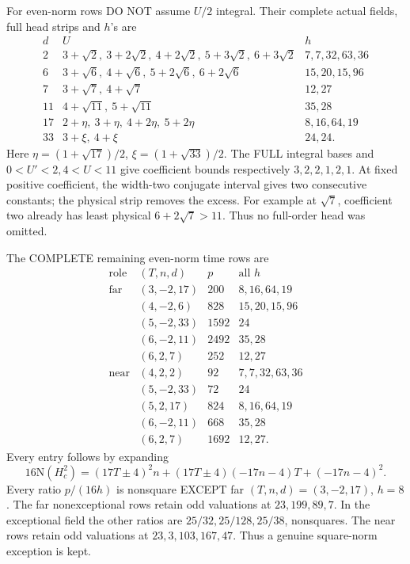 For even-norm rows DO NOT assume \(U/2\)
integral.
Their complete actual fields, full head strips
and \(h\)'s are
\[
\begin{array}{c|l|l}
 d&U&h\\ \hline
2&3+\sqrt2,\ 3+2\sqrt2,\ 4+2\sqrt2,\
     5+3\sqrt2,\ 6+3\sqrt2&7,7,32,63,36\\
6&3+\sqrt6,\ 4+\sqrt6,\ 5+2\sqrt6,\ 6+2\sqrt6&
     15,20,15,96\\
7&3+\sqrt7,\ 4+\sqrt7&12,27\\
11&4+\sqrt{11},\ 5+\sqrt{11}&35,28\\
17&2+\eta,\ 3+\eta,\ 4+2\eta,\ 5+2\eta&
      8,16,64,19\\
33&3+\xi,\ 4+\xi&24,24 .
\end{array}
\]
Here \(\eta=(1+\sqrt{17})/2\),
\(\xi=(1+\sqrt{33})/2\).
The FULL integral bases and \(0<U'<2,4<U<11\)
give coefficient bounds respectively
\(3,2,2,1,2,1\).
At fixed positive coefficient, the width-two
conjugate interval gives two consecutive constants;
the physical strip removes the excess.
For example at \(\sqrt7\), coefficient two
already has least physical \(6+2\sqrt7>11\).
Thus no full-order head was omitted.

The COMPLETE remaining even-norm time rows are
\[
\begin{array}{c|c|r|l}
 \text{role}&(T,n,d)&p&\text{all }h\\ \hline
 \text{far}&(3,-2,17)&200&8,16,64,19\\
 &(4,-2,6)&828&15,20,15,96\\
 &(5,-2,33)&1592&24\\
 &(6,-2,11)&2492&35,28\\
 &(6,2,7)&252&12,27\\
 \text{near}&(4,2,2)&92&7,7,32,63,36\\
 &(5,-2,33)&72&24\\
 &(5,2,17)&824&8,16,64,19\\
 &(6,-2,11)&668&35,28\\
 &(6,2,7)&1692&12,27 .
\end{array}
\]
Every entry follows by expanding
\[
16\mathrm N(H_c^2)
 =(17T\pm4)^2n+(17T\pm4)(-17n-4)T+(-17n-4)^2 .
\]
Every ratio \(p/(16h)\) is nonsquare EXCEPT
far \((T,n,d)=(3,-2,17)\), \(h=8\).
The far nonexceptional rows retain odd valuations
at \(23,199,89,7\).
In the exceptional field the other ratios are
\(25/32,25/128,25/38\), nonsquares.
The near rows retain odd valuations at
\(23,3,103,167,47\).
Thus a genuine square-norm exception is kept.

